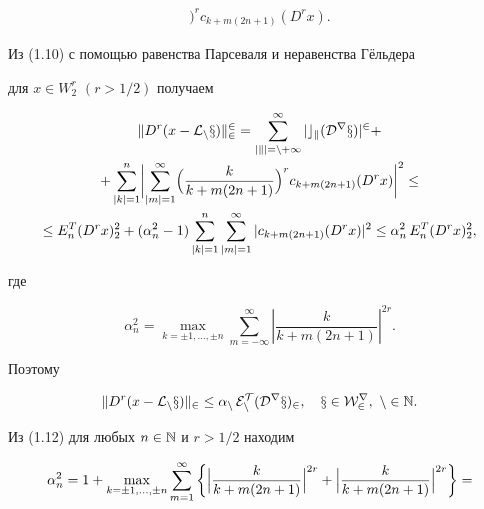 \begin{pf}
\begin{gather}
\Bigr)^rc_{k+m(2n+1)}(D^rx).


\end{gather}


Из (1.10) с помощью равенства Парсеваля и неравенства Г\"ельдера


для $x\in W_2^r$ $(r>1/2)$ получаем


\begin{gather}


\|D^r(x-\cal {L}_nx)\|_2^2=\sum_{|k|=n+1}^\infty|c_k(D^rx)|^2 +\notag\\


%


+ \sum_{|k|=1}^n \biggl| \sum_{|m|=1}^\infty \Bigl( \frac{k}{k+m(2n+1)}


\Bigr)^rc_{k+m(2n+1)}(D^rx)\biggr|^2\le\notag\\


%


\le E_n^T(D^rx)_2^2 +(\alpha_n^2-1)\sum_{|k|=1}^n


\sum_{|m|=1}^\infty |c_{k+m(2n+1)}(D^rx)|^2\le


\alpha_n^2\, E_n^T(D^rx)_2^2,


\end{gather}


где


\begin{equation}


\alpha_n^2=\max_{k=\pm 1, \dotsc ,\pm n}\sum_{m=-\infty }^\infty


\left|\frac{k}{k+m(2n+1)}\right|^{2r}.


\end{equation}


Поэтому


\begin{equation}


\|D^r(x-\cal {L}_nx)\|_2\le \alpha_n\, E_n^T(D^rx)_2,


\quad x\in W_2^r,\ n\in \Bbb{N}.


\end{equation}


Из (1.12) для любых $n\in \Bbb{N}$ и $r>1/2$ находим


\begin{gather}


\alpha_n^2=1+ \max_{k=\pm 1, \dotsc ,\pm n}\sum_{m=1}^\infty


\left\{ \Bigl| \frac{k}{k+m(2n+1)}\Bigr|^{2r} +


\Bigl| \frac{k}{k+m(2n+1)}\Bigr|^{2r}\right\} =\notag\\



\end{gather}
\end{pf}

